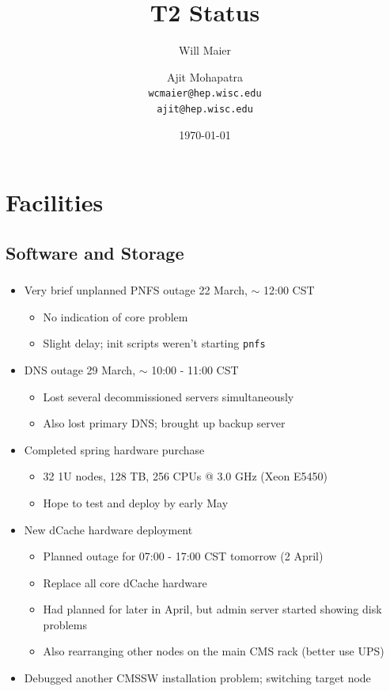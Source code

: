 \documentclass{beamer}
\title{T2 Status}
\author[Maier, Mohapatra]{
    Will Maier \and Ajit Mohapatra\\ 
    {\tt wcmaier@hep.wisc.edu}\\
    {\tt ajit@hep.wisc.edu}}
\institute[Wisconsin]{University of Wisconsin - High Energy Physics}
\date{\today}
\newcommand{\ca}{\ensuremath{\sim}}
\begin{document}

\begin{frame}
    \titlepage
\end{frame}


\section{Facilities}
\subsection{Software and Storage}
\begin{frame}
\frametitle{}
\begin{itemize}
    \item Very brief unplanned PNFS outage 22 March, \ca{} 12:00 CST
    \begin{itemize}
        \item No indication of core problem
        \item Slight delay; init scripts weren't starting {\tt pnfs}
    \end{itemize}
    \item DNS outage 29 March, \ca{} 10:00 - 11:00 CST
    \begin{itemize}
        \item Lost several decommissioned servers simultaneously
        \item Also lost primary DNS; brought up backup server
    \end{itemize}
    \item Completed spring hardware purchase
    \begin{itemize}
        \item 32 1U nodes, 128 TB, 256 CPUs @ 3.0 GHz (Xeon E5450)
        \item Hope to test and deploy by early May
    \end{itemize}
    \item New dCache hardware deployment
    \begin{itemize}
        \item Planned outage for 07:00 - 17:00 CST tomorrow (2 April)
        \item Replace all core dCache hardware
        \item Had planned for later in April, but admin server started showing disk problems
        \item Also rearranging other nodes on the main CMS rack (better use UPS)
    \end{itemize}
    \item Debugged another CMSSW installation problem; switching target node
\end{itemize}
\end{frame}
\end{document}
